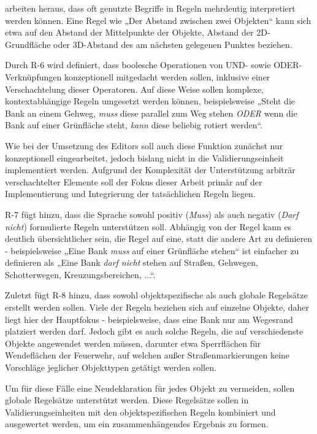 \textcite[S. 8]{sydoraRulebasedComplianceChecking2020} arbeiten heraus, dass oft genutzte Begriffe in Regeln mehrdeutig interpretiert werden können. Eine Regel wie „Der Abstand zwischen zwei Objekten“ kann sich etwa auf den Abstand der Mittelpunkte der Objekte, Abstand der 2D-Grundfläche oder 3D-Abstand des am nächsten gelegenen Punktes beziehen.

\medskip

Durch R-6 wird definiert, dass boolesche Operationen von UND- sowie ODER-Verknüpfungen konzeptionell mitgedacht werden sollen, inklusive einer Verschachtelung dieser Operatoren. Auf diese Weise sollen komplexe, kontextabhängige Regeln umgesetzt werden können, beispielsweise „Steht die Bank an einem Gehweg, \textit{muss} diese parallel zum Weg stehen \textit{ODER} wenn die Bank auf einer Grünfläche steht, \textit{kann} diese beliebig rotiert werden“.

Wie bei der Umsetzung des Editors soll auch diese Funktion zunächst nur konzeptionell eingearbeitet, jedoch bislang nicht in die Validierungseinheit implementiert werden. Aufgrund der Komplexität der Unterstützung arbiträr verschachtelter Elemente soll der Fokus dieser Arbeit primär auf der Implementierung und Integrierung der tatsächlichen Regeln liegen.

\medskip

R-7 fügt hinzu, dass die Sprache sowohl positiv (\textit{Muss}) als auch negativ (\textit{Darf nicht}) formulierte Regeln unterstützen soll. Abhängig von der Regel kann es deutlich übersichtlicher sein, die Regel auf eine, statt die andere Art zu definieren \parencite[S. 44]{trinhConstraintbasedApproachModelling2012} - beispielsweise „Eine Bank \textit{muss} auf einer Grünfläche stehen“ ist einfacher zu definieren als „Eine Bank \textit{darf nicht} stehen auf Straßen, Gehwegen, Schotterwegen, Kreuzungsbereichen, ...“.

\medskip

Zuletzt fügt R-8 hinzu, dass sowohl objektspezifische als auch globale Regelsätze erstellt werden sollen. Viele der Regeln beziehen sich auf einzelne Objekte, daher liegt hier der Hauptfokus - beispielsweise, dass eine Bank nur am Wegesrand platziert werden darf. Jedoch gibt es auch solche Regeln, die auf verschiedenste Objekte angewendet werden müssen, darunter etwa Sperrflächen für Wendeflächen der Feuerwehr, auf welchen außer Straßenmarkierungen keine Vorschläge jeglicher Objekttypen getätigt werden sollen.

Um für diese Fälle eine Neudeklaration für jedes Objekt zu vermeiden, sollen globale Regelsätze unterstützt werden. Diese Regelsätze sollen in Validierungseinheiten mit den objektspezifischen Regeln kombiniert und ausgewertet werden, um ein zusammenhängendes Ergebnis zu formen.


